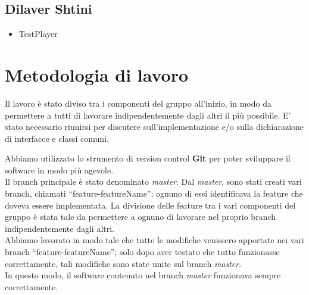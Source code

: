 \documentclass[a4paper,12pt]{report}
\begin{document}
\subsection*{Dilaver Shtini}
\begin{itemize}
    \item TestPlayer
\end{itemize}



\section{Metodologia di lavoro}
Il lavoro è stato diviso tra i componenti del gruppo all'inizio, in modo da permettere a tutti di 
lavorare indipendentemente dagli altri il più possibile.
E' stato necessario riunirsi per discutere sull'implementazione e/o sulla dichiarazione di interfacce e 
classi comuni.

Abbiamo utilizzato lo strumento di version control \textbf{Git} per poter sviluppare il software in modo più agevole.
\\Il branch principale è stato denominato \textit{master}.
Dal \textit{master}, sono stati creati vari branch, chiamati ``feature-featureName''; ognuno di essi identificava la feature che doveva essere implementata. 
La divisione delle feature tra i vari componenti del gruppo è stata tale da permettere a ognuno di lavorare nel proprio branch indipendentemente dagli altri.
\\Abbiamo lavorato in modo tale che tutte le modifiche venissero apportate nei vari branch ``feature-featureName''; solo dopo aver testato che tutto funzionasse correttamente, tali modifiche sono state unite sul branch \textit{master}.
\\In questo modo, il software contenuto nel branch \textit{master} funzionava sempre correttamente.
\end{document}
